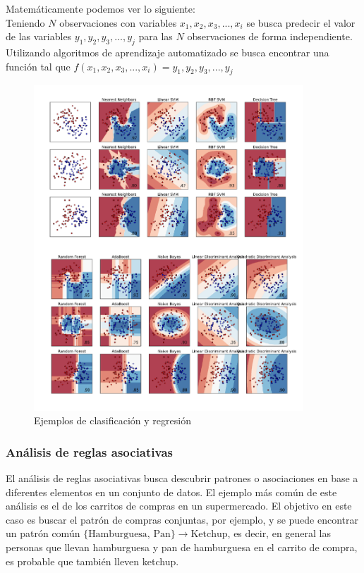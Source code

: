 Matemáticamente podemos ver lo siguiente:\\
Teniendo $N$ observaciones con variables $x_1, x_2, x_3, ... , x_i$ se busca predecir el valor de las variables $y_1, y_2, y_3, ... , y_j$ para las $N$ observaciones de forma independiente.
Utilizando algoritmos de aprendizaje automatizado se busca encontrar una función tal que
$f(x_1, x_2, x_3, ... , x_i) = y_1, y_2, y_3, ... , y_j$

\begin{figure}[H]
  \centering
    \includegraphics[width=0.9\textwidth]{Figuras/Clasificacion}
      \caption{Ejemplos de clasificación y regresión\cite{scikitlearn2014}}
    \label{fig:clasificacion}
\end{figure}

\subsubsection{Análisis de reglas asociativas}
El análisis de reglas asociativas busca descubrir patrones o asociaciones en base a diferentes elementos en un conjunto de datos. El ejemplo más común de este análisis es el de los carritos de compras en un supermercado. El objetivo en este caso es buscar el patrón de compras conjuntas, por ejemplo, y se puede encontrar un patrón común $\{\textrm{Hamburguesa, Pan}\} \to \textrm{Ketchup}$, es decir, en general las personas que llevan hamburguesa y pan de hamburguesa en el carrito de compra, es probable que también lleven ketchup. 

